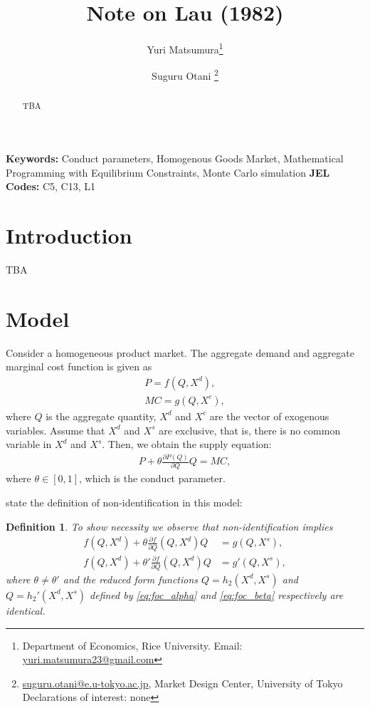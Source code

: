 \documentclass[11pt, a4paper]{article}
\title{Note on Lau (1982)}
\author{Yuri Matsumura\thanks{Department of Economics, Rice University. Email: \href{mailto:}{yuri.matsumura23@gmail.com}} \and Suguru Otani \thanks{\href{mailto:}{suguru.otani@e.u-tokyo.ac.jp}, Market Design Center, University of Tokyo
\\Declarations of interest: none %
}}
\newtheorem{definition}{Definition}
\theoremstyle{remark}
\begin{document}
\maketitle
\begin{abstract}
    TBA
\end{abstract}

\noindent\textbf{Keywords:} Conduct parameters, Homogenous Goods Market, Mathematical Programming with Equilibrium Constraints, Monte Carlo simulation
\vspace{0in}
\newline
\noindent\textbf{JEL Codes:} C5, C13, L1

\bigskip

\section{Introduction}
TBA
\section{Model}
Consider a homogeneous product market.
The aggregate demand and aggregate marginal cost function is given as
\begin{align}
    P = f(Q, X^{d}), \label{eq:demand}
    \\
    MC = g(Q, X^{c}),\label{eq:marginal_cost}
\end{align}
where $Q$ is the aggregate quantity, $X^{d}$ and $X^{c}$ are the vector of exogenous variables.
Assume that $X^{d}$ and $X^{s}$ are exclusive, that is, there is no common variable in $X^{d}$ and $X^{s}$.
Then, we obtain the supply equation:
\begin{align}
     P + \theta\frac{\partial P(Q)}{\partial Q}Q = MC,\label{eq:supply_equation}
\end{align}
where $\theta\in[0,1]$, which is the conduct parameter.

\citet{lau1982identifying} state the definition of non-identification in this model:
\begin{definition}
    To show necessity we observe that non-identification implies
    \begin{align}
    f(Q, X^{d}) + \theta \frac{\partial f}{\partial Q}(Q, X^{d})Q &= g(Q, X^{s}),\label{eq:foc_alpha}\\
    f(Q, X^{d}) + \theta' \frac{\partial f}{\partial Q}(Q, X^{d})Q &= g'(Q, X^{s}), \label{eq:foc_beta}
    \end{align}
    where $\theta \neq \theta'$ and the reduced form functions $Q = h_2(X^{d}, X^{s})$ and $Q = h_2'(X^{d}, X^{s})$ defined by \eqref{eq:foc_alpha} and \eqref{eq:foc_beta} respectively are identical.
\end{definition}
\end{document}

